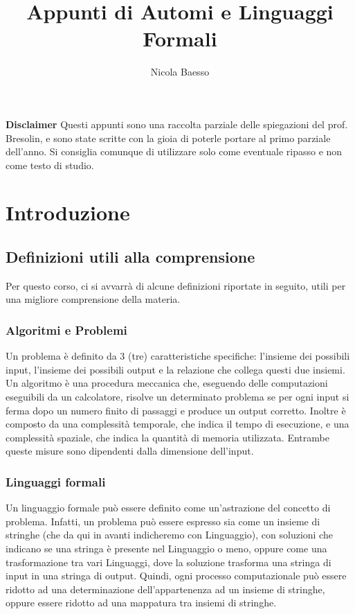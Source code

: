 \documentclass[]{article}
\title{Appunti di Automi e Linguaggi Formali}
\author{Nicola Baesso}
\begin{document}
	\maketitle
	
	\newpage
	\tableofcontents
	\newpage
	
	\textbf{Disclaimer}
	\newline
	\newline
	Questi appunti sono una raccolta parziale delle spiegazioni del prof. Bresolin, e sono state scritte con la gioia di poterle portare al primo parziale dell'anno. Si consiglia comunque di utilizzare solo come eventuale ripasso e non come testo di studio.
	\newpage
	\section{Introduzione}
		\subsection{Definizioni utili alla comprensione}
			Per questo corso, ci si avvarrà di alcune definizioni riportate in seguito, utili per una migliore comprensione della materia.
			\subsubsection{Algoritmi e Problemi}
				Un problema è definito da 3 (tre) caratteristiche specifiche: l'insieme dei possibili input, l'insieme dei possibili output e la relazione che collega questi due insiemi.
				\newline
				Un algoritmo è una procedura meccanica che, eseguendo delle computazioni eseguibili da un calcolatore, risolve un determinato problema se per ogni input si ferma dopo un numero finito di passaggi e produce un output corretto.
				\newline Inoltre è composto da una complessità temporale, che indica il tempo di esecuzione, e una complessità spaziale, che indica la quantità di memoria utilizzata. Entrambe queste misure sono dipendenti dalla dimensione dell'input.
			\subsubsection{Linguaggi formali}
				Un linguaggio formale può essere definito come un'astrazione del concetto di problema. 
				\newline
				Infatti, un problema può essere espresso sia come un insieme di stringhe (che da qui in avanti indicheremo con Linguaggio), con soluzioni che indicano se una stringa è presente nel Linguaggio o meno, oppure come una trasformazione tra vari Linguaggi, dove la soluzione trasforma una stringa di input in una stringa di output.
				\newline
				Quindi, ogni processo computazionale può essere ridotto ad una determinazione dell'appartenenza ad un insieme di stringhe, oppure essere ridotto ad una mappatura tra insiemi di stringhe.
\end{document}
